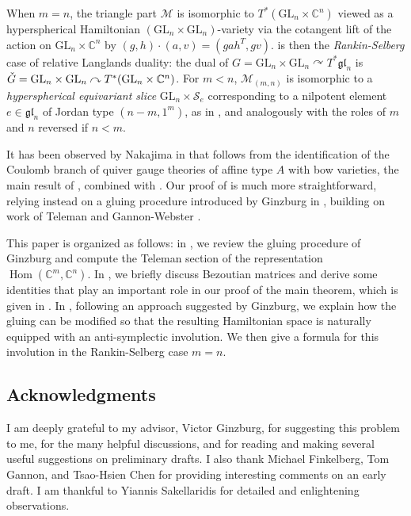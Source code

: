 \documentclass[11pt]{article}
\theoremstyle{definition}
\theoremstyle{plain}
\theoremstyle{remark}
\newcommand{\GL}{\mathrm{GL}}
\newcommand{\numberset}{\mathbb}
\newcommand{\C}{\numberset{C}}
\newcommand{\gl}{\mathfrak{gl}}
\DeclareMathOperator{\Hom}{Hom}
\begin{document}
        When $m=n$, the triangle part $\mathcal{M}$ is isomorphic to $T^*(\GL_n \times \C^n)$ viewed as a hyperspherical Hamiltonian $(\GL_n \times \GL_n)$-variety via the cotangent lift of the action on $\GL_n \times \C^n$ by $(g,h) \cdot (a,v) = (gah^T,gv)$.  is then the \emph{Rankin-Selberg} case of relative Langlands duality: the dual of $G = \GL_n \times \GL_n \curvearrowright T^*\gl_n$ is $\Check{G} = \GL_n \times \GL_n \curvearrowright T^*(\GL_n \times \C^n)$. For $m<n$, $\mathcal{M}_{(m,n)}$ is isomorphic to a \emph{hyperspherical equivariant slice} $\GL_n \times \mathcal{S}_e$ corresponding to a nilpotent element $e \in \gl_n$ of Jordan type $(n-m, 1^m)$, as in \cite{Finkelberg_2025}, and analogously with the roles of $m$ and $n$ reversed if $n<m$.

        It has been observed by Nakajima in \cite{nakajima2024sdualhamiltonianmathbfg} that  follows from the identification of the Coulomb branch of quiver gauge theories of affine type $A$ with bow varieties, the main result of \cite{NakajimaTakayama2017}, combined with \cite[Theorem 2.11]{BFN-Ring}. Our proof of  is much more straightforward, relying instead on a gluing procedure introduced by Ginzburg in \cite{ginzburg2025pointwisepurityderivedsatake}, building on work of Teleman \cite{Teleman2021} and Gannon-Webster \cite{gannon2025functorialitycoulombbranches}. 

        This paper is organized as follows: in , we review the gluing procedure of Ginzburg and compute the Teleman section of the representation $\Hom(\C^m,\C^n)$. In , we briefly discuss Bezoutian matrices and derive some identities that play an important role in our proof of the main theorem, which is given in . In , following an approach suggested by Ginzburg, we explain how the gluing can be modified so that the resulting Hamiltonian space is naturally equipped with an anti-symplectic involution. We then give a formula for this involution in the Rankin-Selberg case $m=n$.

        \subsection*{Acknowledgments}

        I am deeply grateful to my advisor, Victor Ginzburg, for suggesting this problem to me, for the many helpful discussions, and for reading and making several useful suggestions on preliminary drafts. I also thank Michael Finkelberg, Tom Gannon, and Tsao-Hsien Chen for providing interesting comments on an early draft. I am thankful to Yiannis Sakellaridis for detailed and enlightening observations. 
\end{document}
